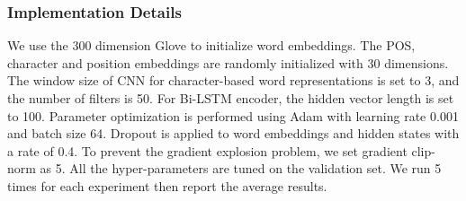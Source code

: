 \documentclass{ecai}
\begin{document}
\subsubsection{Implementation Details}
We use the 300 dimension Glove \cite{pennington2014glove} to initialize word embeddings. 
The POS, character and position embeddings are randomly initialized with 30 dimensions. 
The window size of CNN for character-based word representations is set to 3, and the number of filters is 50. 
For Bi-LSTM encoder, the hidden vector length is set to 100. Parameter optimization is performed using Adam \cite{kingma2014adam} with learning rate 0.001 and batch size 64. 
Dropout is applied to word embeddings and hidden states with a rate of 0.4. 
To prevent the gradient explosion problem, we set gradient clip-norm as 5. 
All the hyper-parameters are tuned on the validation set. 
We run 5 times for each experiment then report the average results.
\end{document}
